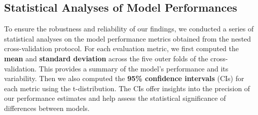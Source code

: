\documentclass[twocolumn]{ceurart}
\begin{document}
\begin{table}[h]
\centering
\small
\caption{Hyperparameters explored for vectorizers and models.}
\label{tab:hyperparameters}
\end{table}

\subsection{Statistical Analyses of Model Performances}

To ensure the robustness and reliability of our findings, we conducted a series of statistical analyses on the model performance metrics obtained from the nested cross-validation protocol. For each evaluation metric, we first computed the \textbf{mean} and \textbf{standard deviation} across the five outer folds of the cross-validation. This provides a summary of the model's performance and its variability. Then we also computed the \textbf{95\% confidence intervals} (CIs) for each metric using the t-distribution. The CIs offer insights into the precision of our performance estimates and help assess the statistical significance of differences between models.
\end{document}
